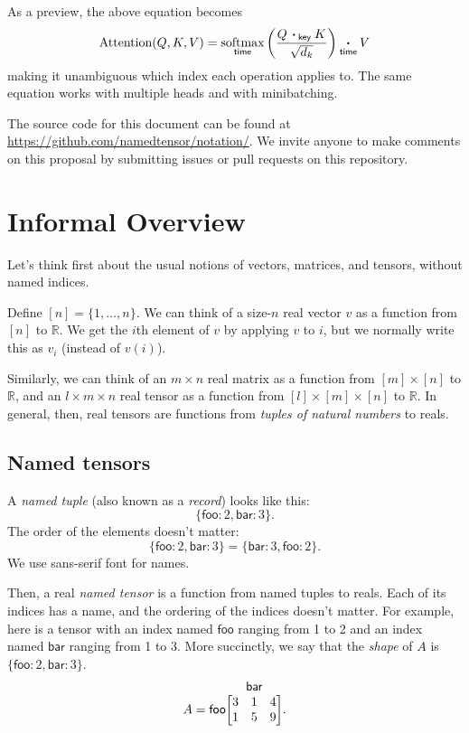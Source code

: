 \documentclass{article}
\makeatletter
\newcommand{\name}[1]{\mathsf{#1}}
\newcommand{\ndot}[1]{\mathbin{\mathop{\thinspace\boldsymbol\cdot\thinspace}\displaylimits_{\name{#1}}}}
\newcommand{\nfun}[2]{\mathop{\text{#2}}\displaylimits_{\name{#1}}}
\newcommand{\tuple}[1]{\{ #1\}}
\newcommand{\nmatrix}[3]{\name{#1}\begin{array}[b]{@{}c@{}}\name{#2}\\\begin{bmatrix}#3\end{bmatrix}\end{array}}
\makeatother
\begin{document}
As a preview, the above equation becomes
\begin{equation*}
  \text{Attention}(Q,K,V) = \nfun{time}{softmax} \left( \frac{Q \ndot{key} K}{\sqrt{d_k}} \right) \ndot{time} V
\end{equation*}
making it unambiguous which index each operation applies to. The same equation works with multiple heads and with minibatching.

The source code for this document can be found at \url{https://github.com/namedtensor/notation/}. We invite anyone to make comments on this proposal by submitting issues or pull requests on this repository.

\section{Informal Overview}
\label{sec:intro}

Let's think first about the usual notions of vectors, matrices, and tensors, without named indices.

Define $[n] = \{1, \ldots, n\}$. We can think of a size-$n$ real vector $v$ as a function from $[n]$ to $\mathbb{R}$. We get the $i$th element of $v$ by applying $v$ to $i$, but we normally write this as $v_i$ (instead of $v(i)$). 

Similarly, we can think of an $m \times n$ real matrix as a function from $[m] \times [n]$ to $\mathbb{R}$, and an $l \times m \times n$ real tensor as a function from $[l] \times [m] \times [n]$ to $\mathbb{R}$. In general, then, real tensors are functions from \emph{tuples of natural numbers} to reals.

\subsection{Named tensors}

A \emph{named tuple} (also known as a \emph{record}) looks like this: \[\tuple{\name{foo}: 2, \name{bar}: 3}.\] The order of the elements doesn't matter: \[\tuple{\name{foo}: 2, \name{bar}: 3} = \tuple{\name{bar}: 3, \name{foo}: 2}.\] We use \textsf{sans-serif} font for names.

Then, a real \emph{named tensor} is a function from named tuples to reals. Each of its indices has a name, and the ordering of the indices doesn't matter. For example, here is a tensor with an index named $\name{foo}$ ranging from 1 to 2 and an index named $\name{bar}$ ranging from 1 to 3. More succinctly, we say that the \emph{shape} of $A$ is $\tuple{\name{foo}:2, \name{bar}:3}$.
\begin{equation*}
A = \nmatrix{foo}{bar}{
  3 & 1 & 4 \\
  1 & 5 & 9
}.
\end{equation*}
\end{document}
